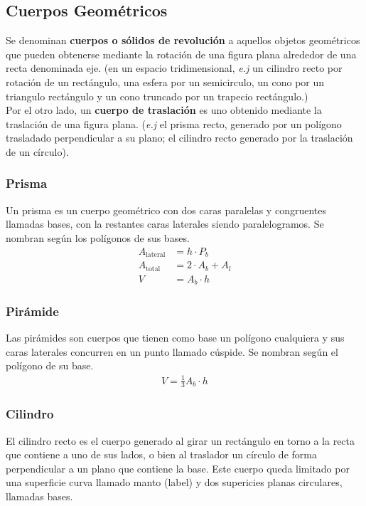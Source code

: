\subsection{Cuerpos Geométricos}
Se denominan \textbf{cuerpos o sólidos de revolución} a aquellos objetos geométricos que pueden obtenerse mediante la rotación de una figura plana alrededor de una recta denominada eje. (en un espacio tridimensional, \textit{e.j} un cilindro recto por rotación de un rectángulo, una esfera por un semicirculo, un cono por un triangulo rectángulo y un cono truncado por un trapecio rectángulo.)\\

Por el otro lado, un \textbf{cuerpo de traslación} es uno obtenido mediante la traslación de una figura plana. (\textit{e.j} el prisma recto, generado por un polígono trasladado perpendicular a su plano; el cilindro recto generado por la traslación de un círculo).
\subsubsection{Prisma}
Un prisma es un cuerpo geométrico con dos caras paralelas y congruentes llamadas bases, con la restantes caras laterales siendo paralelogramos. Se nombran según los polígonos de sus bases. \\
\begin{equation*}
    \begin{split} 
    A_{\text{lateral}} &= h \cdot P_b\\
    A_{\text{total}} &= 2\cdot A_b + A_l\\
    V &= A_b\cdot h
    \end{split}
\end{equation*}

\subsubsection{Pirámide}
Las pirámides son cuerpos que tienen como base un polígono cualquiera y sus caras laterales concurren en un punto llamado cúspide. Se nombran según el polígono de su base.\\
\begin{equation*}
    \begin{aligned} 
    V = \frac{1}{3}A_b\cdot h
    \end{aligned}
\end{equation*}
\subsubsection{Cilindro}
El cilindro recto es el cuerpo generado al girar un rectángulo en torno a la recta que contiene a uno de sus lados, o bien al traslador un círculo de forma perpendicular a un plano que contiene la base. Este cuerpo queda limitado por una superficie curva llamado manto (label) y dos supericies planas circulares, llamadas bases.

